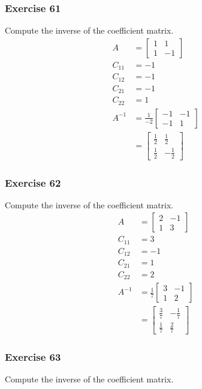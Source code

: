 \documentclass{math}
\begin{document}
\subsubsection*{Exercise 61}
Compute the inverse of the coefficient matrix.
\begin{align*}
  A &= \begin{bmatrix}1 & 1 \\ 1 & -1\end{bmatrix} \\
  C_{11} &= -1 \\
  C_{12} &= -1 \\
  C_{21} &= -1 \\
  C_{22} &= 1 \\
  A^{-1} &= \frac{1}{-2}\begin{bmatrix}-1 & -1 \\ -1 & 1\end{bmatrix} \\
  &= \begin{bmatrix}
    \frac{1}{2} & \frac{1}{2} \\[0.5em]
    \frac{1}{2} & -\frac{1}{2}
  \end{bmatrix}
\end{align*}

\subsubsection*{Exercise 62}
Compute the inverse of the coefficient matrix.
\begin{align*}
  A &= \begin{bmatrix}2 & -1 \\ 1 & 3\end{bmatrix} \\
  C_{11} &= 3 \\
  C_{12} &= -1 \\
  C_{21} &= 1 \\
  C_{22} &= 2 \\
  A^{-1} &= \frac{1}{7}\begin{bmatrix}3 & -1 \\ 1 & 2\end{bmatrix} \\
  &= \begin{bmatrix}
    \frac{3}{7} & -\frac{1}{7} \\[0.5em]
    \frac{1}{7} & \frac{2}{7}
  \end{bmatrix}
\end{align*}

\subsubsection*{Exercise 63}
Compute the inverse of the coefficient matrix.
\end{document}
